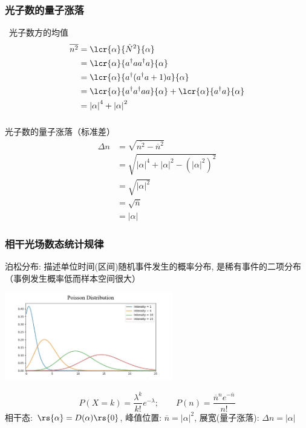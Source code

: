 \begin{frame}
    \frametitle{光子数的量子涨落}
        \解 ~光子数方的均值 
    \[ \begin{aligned}
    \overline{n^2}&=\lcr{\alpha}{\hat{N}^2}{\alpha} \\ 
    &= \lcr{\alpha}{a^{\dagger} a a^{\dagger} a  }{\alpha}  \\ 
    &= \lcr{\alpha}{a^{\dagger} (a^{\dagger}  a+1) a  }{\alpha}  \\ 
    &= \lcr{\alpha}{a^{\dagger} a^{\dagger}  a a  }{\alpha} + \lcr{\alpha}{a^{\dagger} a  }{\alpha}  \\ 
    &= \left| \alpha\right|^4 + \left| \alpha\right|^2
    \end{aligned}\]

\end{frame}

\begin{frame}
      \frametitle{}  
    光子数的量子涨落（标准差）
    \[
    \begin{aligned}
    \Delta n & = \sqrt{ \overline{n^2}- \overline{n}^2} \\ 
    & = \sqrt{ \left| \alpha\right|^4 + \left| \alpha\right|^2- (\left| \alpha\right|^2)^2} \\ 
    & = \sqrt{  \left| \alpha\right|^2} \\ 
    & = \sqrt{ \overline{n}} \\ 
    &= \left| \alpha\right|
    \end{aligned}    
    \]
\end{frame} 

\begin{frame}
    \frametitle{相干光场数态统计规律}
    {\Bullet}泊松分布: 描述单位时间(区间)随机事件发生的概率分布, 是稀有事件的二项分布（事例发生概率低而样本空间很大）
      \begin{center}
           \includegraphics[width=0.55\textwidth]{figs/2022-04-27-09-17-50.png}
      \end{center}
   \[ P(X=k)=\frac{\lambda^{k}}{k !} e^{-\lambda} ; \qquad P (n) =  \frac{ \overline{n} ^{n} e^{-\overline{n}}}{n!} \]
   相干态: $ \rs{\alpha} =  D(\alpha)  \rs{0} $, 
   峰值位置: $ \overline{n} = \left| \alpha\right|^2 $, 展宽(量子涨落): $ \Delta n = \left| \alpha\right| $ 
\end{frame}

